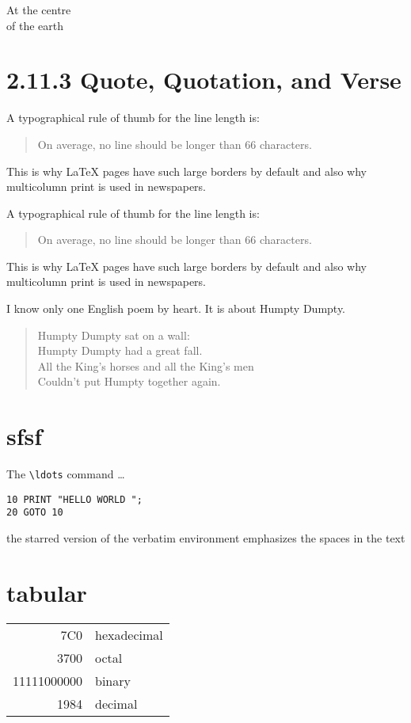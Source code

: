 \documentclass[UTF8]{ctexart}
\begin{document}
\begin{center}
	At the centre\\of the earth
\end{center}


\section{2.11.3 Quote, Quotation, and Verse}

A typographical rule of thumb
for the line length is:
\begin{quote}
	On average, no line should
	be longer than 66 characters.
\end{quote}
This is why \LaTeX{} pages have
such large borders by default and
also why multicolumn print is
used in newspapers.


A typographical rule of thumb
for the line length is:
\begin{quote}
	On average, no line should
	be longer than 66 characters.
\end{quote}
This is why \LaTeX{} pages have
such large borders by default and
also why multicolumn print is
used in newspapers.



I know only one English poem by
heart. It is about Humpty Dumpty.
\begin{flushleft}
	\begin{verse}
		Humpty Dumpty sat on a wall:\\
		Humpty Dumpty had a great fall.\\
		All the King’s horses and all
		the King’s men\\
		Couldn’t put Humpty together
		again.
	\end{verse}
\end{flushleft}


\section{sfsf}
The \verb|\ldots| command \ldots
\begin{verbatim}
10 PRINT "HELLO WORLD ";
20 GOTO 10
\end{verbatim}


\begin{verbatim*}
the starred version of
the verbatim
environment emphasizes
the spaces in the text
\end{verbatim*}

\section{tabular}
\begin{tabular}{|r|l|}
	\hline
	7C0 & hexadecimal \\
	3700 & octal \\
	\cline{2-2}
	11111000000 & binary \\
	\hline \hline
	1984 & decimal \\
	\hline
\end{tabular}
\end{document}
